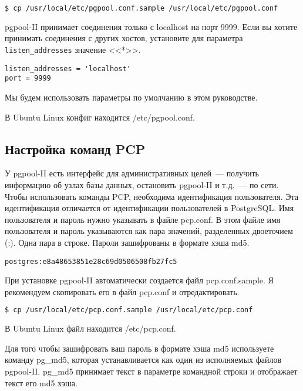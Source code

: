 \begin{lstlisting}[language=Bash,label=lst:pgpool4,caption=Файлы конфигурации]
$ cp /usr/local/etc/pgpool.conf.sample /usr/local/etc/pgpool.conf
\end{lstlisting}

pgpool-II принимает соединения только с localhost на порт 9999. Если вы хотите принимать соединения с других хостов, установите для параметра \lstinline!listen_addresses! значение <<*>>.

\begin{lstlisting}[label=lst:pgpool5,caption=Файлы конфигурации]
listen_addresses = 'localhost'
port = 9999
\end{lstlisting}

Мы будем использовать параметры по умолчанию в этом руководстве.

В Ubuntu Linux конфиг находится /etc/pgpool.conf.

\subsection{Настройка команд PCP}

У pgpool-II есть интерфейс для административных целей~--- получить информацию об узлах базы данных, остановить pgpool-II и т.д.~--- по сети. Чтобы использовать команды PCP, необходима идентификация пользователя. Эта идентификация отличается от идентификации пользователей в PostgreSQL. Имя пользователя и пароль нужно указывать в файле pcp.conf. В этом файле имя пользователя и пароль указываются как пара значений, разделенных двоеточием (:). Одна пара в строке. Пароли зашифрованы в формате хэша md5.

\begin{lstlisting}[label=lst:pgpool6,caption=Настройка команд PCP]
postgres:e8a48653851e28c69d0506508fb27fc5
\end{lstlisting}

При установке pgpool-II автоматически создается файл pcp.conf.sample. Я рекомендуем скопировать его в файл pcp.conf и отредактировать.

\begin{lstlisting}[language=Bash,label=lst:pgpool7,caption=Настройка команд PCP]
$ cp /usr/local/etc/pcp.conf.sample /usr/local/etc/pcp.conf
\end{lstlisting}

В Ubuntu Linux файл находится /etc/pcp.conf.

Для того чтобы зашифровать ваш пароль в формате хэша md5 используете команду pg\_md5, которая устанавливается как один из исполняемых файлов pgpool-II. pg\_md5 принимает текст в параметре командной строки и отображает текст его md5 хэша.

